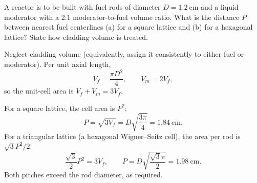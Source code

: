 

A reactor is to be built with fuel rods of diameter $D=1.2~\mathrm{cm}$ and
a liquid moderator with a 2:1 moderator-to-fuel volume ratio. What is the
distance $P$ between nearest fuel centerlines (a) for a square lattice and
(b) for a hexagonal lattice? State how cladding volume is treated.

\begin{adaptedsolution}
Neglect cladding volume (equivalently, assign it consistently to either fuel
or moderator). Per unit axial length,
\[
V_f=\frac{\pi D^2}{4},\qquad V_m=2V_f,
\]
so the unit-cell area is $V_f+V_m=3V_f$.

For a square lattice, the cell area is $P^2$:
\[
P=\sqrt{3V_f}=D\sqrt{\frac{3\pi}{4}}
=\boxed{1.84~\mathrm{cm}}.
\]
For a triangular lattice (a hexagonal Wigner--Seitz cell), the area per rod
is $\sqrt{3}P^2/2$:
\[
\frac{\sqrt{3}}{2}P^2=3V_f,
\qquad
P=D\sqrt{\frac{\sqrt{3}\pi}{2}}
=\boxed{1.98~\mathrm{cm}}.
\]
Both pitches exceed the rod diameter, as required.
\end{adaptedsolution}
